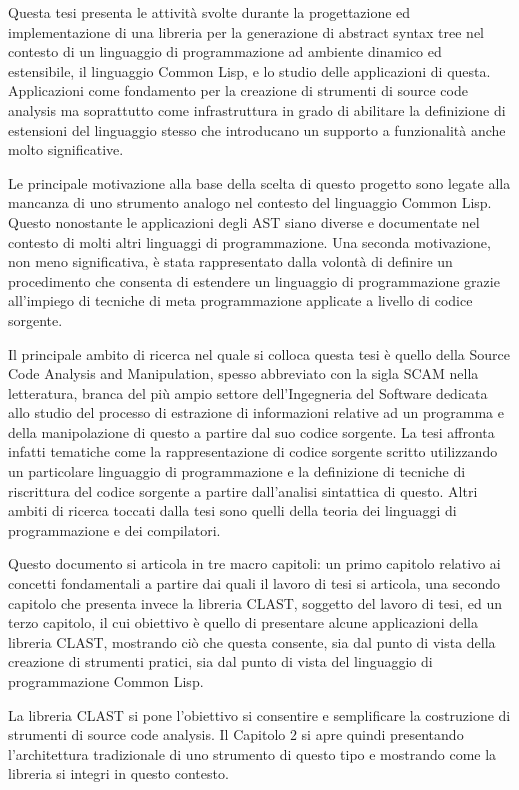 \documentclass{book}
\begin{document}
Questa tesi presenta le attività svolte durante la progettazione ed
implementazione di una libreria per la generazione di abstract syntax tree nel
contesto di un linguaggio di programmazione ad ambiente dinamico ed estensibile,
il linguaggio Common Lisp, e lo studio delle applicazioni di questa.
Applicazioni come fondamento per la creazione di strumenti di source code
analysis ma soprattutto come infrastruttura in grado di abilitare la definizione
di estensioni del linguaggio stesso che introducano un supporto a funzionalità
anche molto significative.

Le principale motivazione alla base della scelta di questo progetto sono legate
alla mancanza di uno strumento analogo nel contesto del linguaggio Common Lisp.
Questo nonostante le applicazioni degli AST siano diverse e documentate nel
contesto di molti altri linguaggi di programmazione. Una seconda motivazione,
non meno significativa, è stata rappresentato dalla volontà di definire un
procedimento che consenta di estendere un linguaggio di programmazione grazie
all’impiego di tecniche di meta programmazione applicate a livello di codice
sorgente.

Il principale ambito di ricerca nel quale si colloca questa tesi è quello della
Source Code Analysis and Manipulation, spesso abbreviato con la sigla SCAM nella
letteratura, branca del più ampio settore dell’Ingegneria del Software dedicata
allo studio del processo di estrazione di informazioni relative ad un programma
e della manipolazione di questo a partire dal suo codice sorgente. La tesi
affronta infatti tematiche come la rappresentazione di codice sorgente scritto
utilizzando un particolare linguaggio di programmazione e la definizione di
tecniche di riscrittura del codice sorgente a partire dall’analisi sintattica di
questo. Altri ambiti di ricerca toccati dalla tesi sono quelli della teoria dei
linguaggi di programmazione e dei compilatori.

Questo documento si articola in tre macro capitoli: un primo capitolo relativo
ai concetti fondamentali a partire dai quali il lavoro di tesi si articola, una
secondo capitolo che presenta invece la libreria CLAST, soggetto del lavoro di
tesi, ed un terzo capitolo, il cui obiettivo è quello di presentare alcune
applicazioni della libreria CLAST, mostrando ciò che questa consente, sia dal
punto di vista della creazione di strumenti pratici, sia dal punto di vista del
linguaggio di programmazione Common Lisp.

La libreria CLAST si pone l’obiettivo si consentire e semplificare la
costruzione di strumenti di source code analysis. Il Capitolo 2 si apre quindi
presentando l’architettura tradizionale di uno strumento di questo tipo e
mostrando come la libreria si integri in questo contesto.
\end{document}
